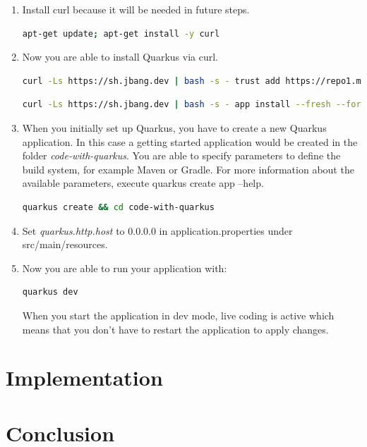     \begin{enumerate}
        \item Install curl because it will be needed in future steps.
        \begin{lstlisting}[language=bash] 
apt-get update; apt-get install -y curl
        \end{lstlisting}
        \item Now you are able to install Quarkus via curl.
        \begin{lstlisting}[language=bash, breaklines=true] 
curl -Ls https://sh.jbang.dev | bash -s - trust add https://repo1.maven.org/maven2/io/quarkus/quarkus-cli/
        \end{lstlisting}

        \begin{lstlisting}[language=bash, breaklines=true] 
curl -Ls https://sh.jbang.dev | bash -s - app install --fresh --force quarkus@quarkusio
        \end{lstlisting}

        \item When you initially set up Quarkus, you have to create a new Quarkus application. In this case a getting started application would be created in the folder \textit{code-with-quarkus}. You are able to specify parameters to define the build system, for example Maven or Gradle. For more information about the available parameters, execute quarkus create app --help.
        \begin{lstlisting}[language=bash, breaklines=true] 
quarkus create && cd code-with-quarkus
        \end{lstlisting}
        \item Set \textit{quarkus.http.host} to 0.0.0.0 in application.properties under src/main/resources.
        \item Now you are able to run your application with:
        \begin{lstlisting}[language=bash]
quarkus dev
        \end{lstlisting}
        When you start the application in dev mode, live coding is active which means that you don't have to restart the application to apply changes.
    \end{enumerate}


\chapter{Implementation}


\chapter{Conclusion} %

